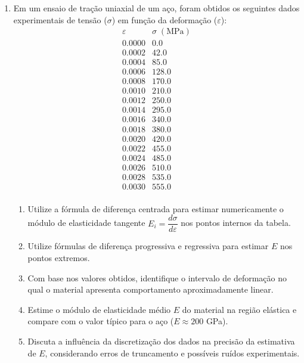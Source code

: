 \begin{enumerate}
\item Em um ensaio de tração uniaxial de um aço, foram obtidos os seguintes dados experimentais de tensão ($\sigma$) 
em função da deformação ($\varepsilon$):
\[
\begin{array}{c|c}
\varepsilon & \sigma \; (\text{MPa}) \\
\hline
0.0000 &   0.0 \\
0.0002 &  42.0 \\
0.0004 &  85.0 \\
0.0006 & 128.0 \\
0.0008 & 170.0 \\
0.0010 & 210.0 \\
0.0012 & 250.0 \\
0.0014 & 295.0 \\
0.0016 & 340.0 \\
0.0018 & 380.0 \\
0.0020 & 420.0 \\
0.0022 & 455.0 \\
0.0024 & 485.0 \\
0.0026 & 510.0 \\
0.0028 & 535.0 \\
0.0030 & 555.0 \\
\end{array}
\]

\begin{enumerate}
\item Utilize a fórmula de diferença centrada para estimar numericamente o módulo de elasticidade tangente
 $ E_i = \dfrac{d\sigma}{d\varepsilon}$ nos pontos internos da tabela.

\item Utilize fórmulas de diferença progressiva e regressiva para estimar $E$ nos pontos extremos.

\item Com base nos valores obtidos, identifique o intervalo de deformação no qual o material apresenta comportamento aproximadamente linear.

\item Estime o módulo de elasticidade médio $E$ do material na região elástica e compare com o valor típico para o aço ($E \approx 200$ GPa).

\item Discuta a influência da discretização dos dados na precisão da estimativa de $E$, 
considerando erros de truncamento e possíveis ruídos experimentais.

\end{enumerate}



\end{enumerate}
